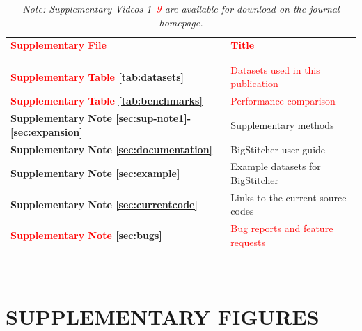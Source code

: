 \documentclass[]{spie}  %
\def\red{\textcolor{red}}
\newcommand\tablespace{\vspace{2.5mm}}
\begin{document}
\begin{table}[h!]
\center
{
\fontsize{12pt}{11pt}\selectfont
\center
\begin{tabular}{lp{11cm}}
\textbf{\textcolor{red}{Supplementary File}} & \textbf{\textcolor{red}{Title}}\\ \\
\hline
\\
\textbf{\red{Supplementary Table \ref{tab:datasets}}} & \red{Datasets used in this publication} \tablespace \\
\textbf{\red{Supplementary Table \ref{tab:benchmarks}}} & \red{Performance comparison} \tablespace \\
\textbf{Supplementary Note \ref{sec:sup-note1}-\ref{sec:expansion}} & Supplementary methods \tablespace \\
\textbf{Supplementary Note \ref{sec:documentation}} & BigStitcher user guide \tablespace \\
\textbf{Supplementary Note \ref{sec:example}} & Example datasets for BigStitcher \tablespace \\
\textbf{Supplementary Note \ref{sec:currentcode}} & Links to the current source codes \tablespace \\
\textbf{\red{Supplementary Note \ref{sec:bugs}}} & \red{Bug reports and feature requests} \tablespace \\

\end{tabular}}
\caption{\emph{Note: Supplementary Videos 1--\red{9} are available for download on the journal homepage.}}
\end{table}

~
\pagebreak

\section*{SUPPLEMENTARY FIGURES}
\end{document}
